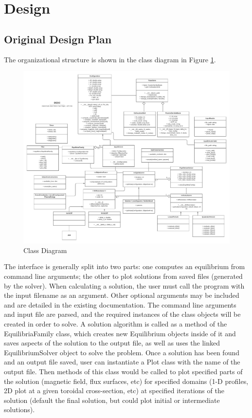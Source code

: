 \documentclass{article}
\begin{document}
\section{Design}

\subsection{Original Design Plan}

The organizational structure is shown in the class diagram in Figure \ref{fig:uml}.
%
\begin{figure}[H]
  \centering
  \includegraphics[width=\linewidth,center]{./figs/UML_06.pdf}
  \caption{Class Diagram}
  \label{fig:uml}
\end{figure}

The interface is generally split into two parts: one computes an equilibrium from command line arguments; the other to plot solutions from saved files (generated by the solver).
When calculating a solution, the user must call the program with the input filename as an argument. Other optional arguments may be included and are detailed in the existing documentation.
The command line arguments and input file are parsed, and the required instances of the class objects will be created in order to solve.
A solution algorithm is called as a method of the EquilibriaFamily class, which creates new Equilibrium objects inside of it and saves aspects of the solution to the output file, as well as uses the linked EquilibriumSolver object to solve the problem.
Once a solution has been found and an output file saved, user can instantiate a Plot class with the name of the output file.
Then methods of this class would be called to plot specified parts of the solution (magnetic field, flux surfaces, etc) for specified domains (1-D profiles, 2D plot at a given toroidal cross-section, etc) at specified iterations of the solution (default the final solution, but could plot initial or intermediate solutions).
\end{document}
